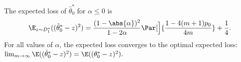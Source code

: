 \begin{theorem}
    \label{theorem: expected_loss}
    The expected loss of $\hat{\theta}_0^\ast$ for $\alpha \le 0$ is
    \[
        \E_{z \sim D^*_1}((\hat{\theta}^*_0 - z)^2) = \frac{(1 -
        \abs{\alpha})^2}{1-2\alpha} \Par[\Big]{\frac{1 - 4(m+1)p_0}{4m}} +
        \frac{1}{4}.
    \]
    For all values of $\alpha$, the expected loss converges to the
    optimal expected loss: $\lim_{m \to \infty} \E((\hat{\theta}_0^\ast - z)^2) =
        \E(({\theta}_0^\ast - z)^2).$
\end{theorem}

